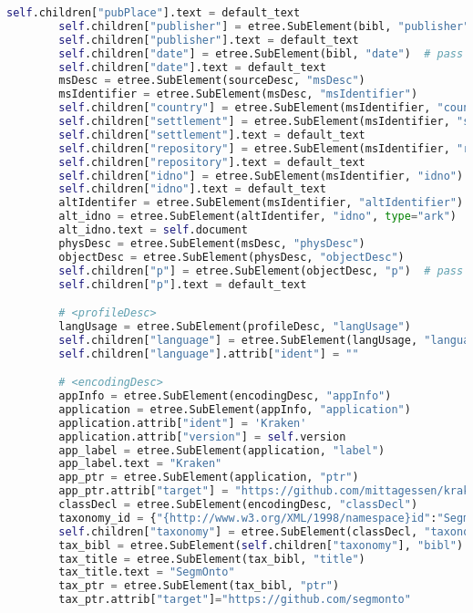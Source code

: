 \documentclass[class=article, crop=false]{standalone}
\begin{document}
\begin{lstlisting}[language=python, style=python]
        self.children["pubPlace"].text = default_text
        self.children["publisher"] = etree.SubElement(bibl, "publisher")  # pass to other methods
        self.children["publisher"].text = default_text
        self.children["date"] = etree.SubElement(bibl, "date")  # pass to other methods
        self.children["date"].text = default_text
        msDesc = etree.SubElement(sourceDesc, "msDesc")
        msIdentifier = etree.SubElement(msDesc, "msIdentifier")
        self.children["country"] = etree.SubElement(msIdentifier, "country")  # pass to other methods
        self.children["settlement"] = etree.SubElement(msIdentifier, "settlement")  # pass to other methods
        self.children["settlement"].text = default_text
        self.children["repository"] = etree.SubElement(msIdentifier, "repository")  # pass to other methods
        self.children["repository"].text = default_text
        self.children["idno"] = etree.SubElement(msIdentifier, "idno")  # pass to other methods
        self.children["idno"].text = default_text
        altIdentifer = etree.SubElement(msIdentifier, "altIdentifier")
        alt_idno = etree.SubElement(altIdentifer, "idno", type="ark")  # pass to other methods
        alt_idno.text = self.document
        physDesc = etree.SubElement(msDesc, "physDesc")
        objectDesc = etree.SubElement(physDesc, "objectDesc")
        self.children["p"] = etree.SubElement(objectDesc, "p")  # pass to other methods
        self.children["p"].text = default_text

        # <profileDesc>
        langUsage = etree.SubElement(profileDesc, "langUsage")
        self.children["language"] = etree.SubElement(langUsage, "language") # pass to other methods
        self.children["language"].attrib["ident"] = ""

        # <encodingDesc>
        appInfo = etree.SubElement(encodingDesc, "appInfo")
        application = etree.SubElement(appInfo, "application")
        application.attrib["ident"] = 'Kraken'
        application.attrib["version"] = self.version
        app_label = etree.SubElement(application, "label")
        app_label.text = "Kraken"
        app_ptr = etree.SubElement(application, "ptr")
        app_ptr.attrib["target"] = "https://github.com/mittagessen/kraken"
        classDecl = etree.SubElement(encodingDesc, "classDecl")
        taxonomy_id = {"{http://www.w3.org/XML/1998/namespace}id":"SegmOnto"}
        self.children["taxonomy"] = etree.SubElement(classDecl, "taxonomy", taxonomy_id)
        tax_bibl = etree.SubElement(self.children["taxonomy"], "bibl")
        tax_title = etree.SubElement(tax_bibl, "title")
        tax_title.text = "SegmOnto"
        tax_ptr = etree.SubElement(tax_bibl, "ptr")
        tax_ptr.attrib["target"]="https://github.com/segmonto"

\end{lstlisting}
\end{document}
